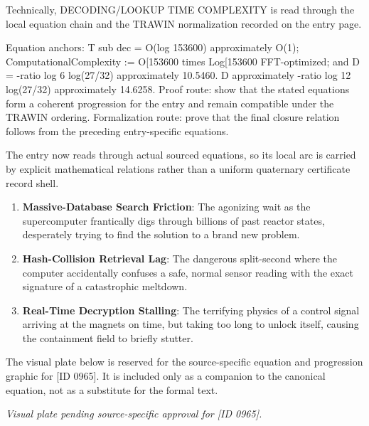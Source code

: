 Technically, DECODING/LOOKUP TIME COMPLEXITY is read through the local equation chain and the TRAWIN normalization recorded on the entry page.

Equation anchors: T sub dec = O(log 153600) approximately O(1); ComputationalComplexity := O[153600 times Log[153600 FFT-optimized; and D = -ratio log 6 log(27/32) approximately 10.5460. D approximately -ratio log 12 log(27/32) approximately 14.6258. Proof route: show that the stated equations form a coherent progression for the entry and remain compatible under the TRAWIN ordering. Formalization route: prove that the final closure relation follows from the preceding entry-specific equations.

The entry now reads through actual sourced equations, so its local arc is carried by explicit mathematical relations rather than a uniform quaternary certificate record shell.
\endgroup

\begin{enumerate}[leftmargin=1.6em,itemsep=6pt,topsep=4pt]
\item \textbf{Massive-Database Search Friction}: The agonizing wait as the supercomputer frantically digs through billions of past reactor states, desperately trying to find the solution to a brand new problem.
\item \textbf{Hash-Collision Retrieval Lag}: The dangerous split-second where the computer accidentally confuses a safe, normal sensor reading with the exact signature of a catastrophic meltdown.
\item \textbf{Real-Time Decryption Stalling}: The terrifying physics of a control signal arriving at the magnets on time, but taking too long to unlock itself, causing the containment field to briefly stutter.
\end{enumerate}

\begingroup\footnotesize\sloppy
The visual plate below is reserved for the source-specific equation and progression graphic for [ID 0965]. It is included only as a companion to the canonical equation, not as a substitute for the formal text.
\par\endgroup
\begingroup\footnotesize\itshape
Visual plate pending source-specific approval for [ID 0965].
\par\endgroup

